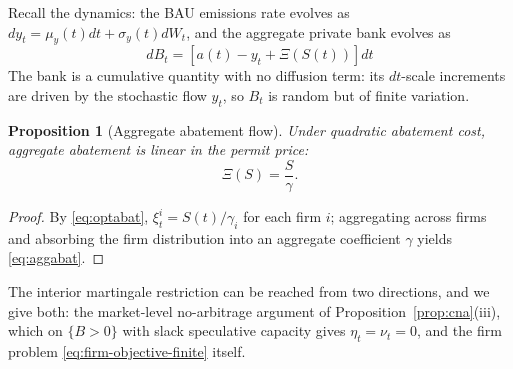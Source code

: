 \documentclass[11pt,letterpaper]{article}
\theoremstyle{plain}
\newtheorem{proposition}[theorem]{Proposition}
\theoremstyle{definition}
\numberwithin{equation}{section}
\begin{document}
Recall the dynamics: the BAU emissions rate evolves as $dy_t = \mu_y(t)dt+\sigma_y(t)dW_t$, and the aggregate private bank evolves as
\begin{equation}
dB_t=[a(t)-y_t+\Xi(S(t))]dt
\end{equation}
The bank is a cumulative quantity with no diffusion term: its $dt$-scale increments are driven by the stochastic flow $y_t$, so $B_t$ is random but of finite variation.

\begin{proposition}[Aggregate abatement flow]\label{prop:abatement}
Under quadratic abatement cost, aggregate abatement is linear in the permit price:
\begin{equation}\label{eq:aggabat}
  \Xi(S) = \frac{S}{\gamma}.
\end{equation}
\end{proposition}

\begin{proof} By \eqref{eq:optabat}, $\xi_t^i=S(t)/\gamma_i$ for each firm $i$; aggregating across firms and absorbing the firm distribution into an aggregate coefficient $\gamma$ yields \eqref{eq:aggabat}. \end{proof}

The interior martingale restriction can be reached from two directions, and we give both: the market-level no-arbitrage argument of Proposition~\ref{prop:cna}(iii), which on $\{B>0\}$ with slack speculative capacity gives $\eta_t=\nu_t=0$, and the firm problem \eqref{eq:firm-objective-finite} itself.
\end{document}
